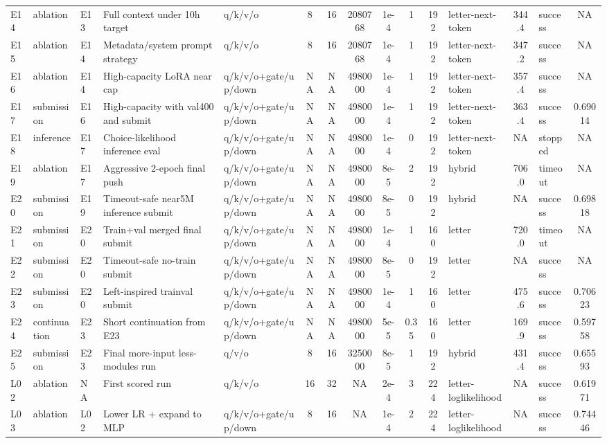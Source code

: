 \begin{table}[p]
\begin{tabular}{l l l p{2.8cm} p{2.5cm} c c c c c c p{1.8cm} c l c}
E14 & ablation & E13 & Full context under 10h target & q/k/v/o & 8 & 16 & 2080768 & 1e-4 & 1 & 192 & letter-next-token & 344.4 & success & NA \\
E15 & ablation & E14 & Metadata/system prompt strategy & q/k/v/o & 8 & 16 & 2080768 & 1e-4 & 1 & 192 & letter-next-token & 347.2 & success & NA \\
E16 & ablation & E14 & High-capacity LoRA near cap & q/k/v/o+gate/up/down & NA & NA & 4980000 & 1e-4 & 1 & 192 & letter-next-token & 357.4 & success & NA \\
E17 & submission & E16 & High-capacity with val400 and submit & q/k/v/o+gate/up/down & NA & NA & 4980000 & 1e-4 & 1 & 192 & letter-next-token & 363.4 & success & 0.69014 \\
E18 & inference & E17 & Choice-likelihood inference eval & q/k/v/o+gate/up/down & NA & NA & 4980000 & 1e-4 & 0 & 192 & letter-next-token & NA & stopped & NA \\
E19 & ablation & E17 & Aggressive 2-epoch final push & q/k/v/o+gate/up/down & NA & NA & 4980000 & 8e-5 & 2 & 192 & hybrid & 706.0 & timeout & NA \\
E20 & submission & E19 & Timeout-safe near5M inference submit & q/k/v/o+gate/up/down & NA & NA & 4980000 & 8e-5 & 0 & 192 & hybrid & NA & success & 0.69818 \\
E21 & submission & E20 & Train+val merged final submit & q/k/v/o+gate/up/down & NA & NA & 4980000 & 1e-4 & 1 & 160 & letter & 720.0 & timeout & NA \\
E22 & submission & E20 & Timeout-safe no-train submit & q/k/v/o+gate/up/down & NA & NA & 4980000 & 8e-5 & 0 & 192 & letter & NA & success & NA \\
E23 & submission & E20 & Left-inspired trainval submit & q/k/v/o+gate/up/down & NA & NA & 4980000 & 1e-4 & 1 & 160 & letter & 475.6 & success & 0.70623 \\
E24 & continuation & E23 & Short continuation from E23 & q/k/v/o+gate/up/down & NA & NA & 4980000 & 5e-5 & 0.35 & 160 & letter & 169.9 & success & 0.59758 \\
E25 & submission & E23 & Final more-input less-modules run & q/v/o & 8 & 16 & 3250000 & 8e-5 & 1 & 192 & hybrid & 431.4 & success & 0.65593 \\
L02 & ablation & NA & First scored run & q/k/v/o & 16 & 32 & NA & 2e-4 & 3 & 224 & letter-loglikelihood & NA & success & 0.61971 \\
L03 & ablation & L02 & Lower LR + expand to MLP & q/k/v/o+gate/up/down & 8 & 16 & NA & 1e-4 & 2 & 224 & letter-loglikelihood & NA & success & 0.74446 \\

\end{tabular}
\end{table}
